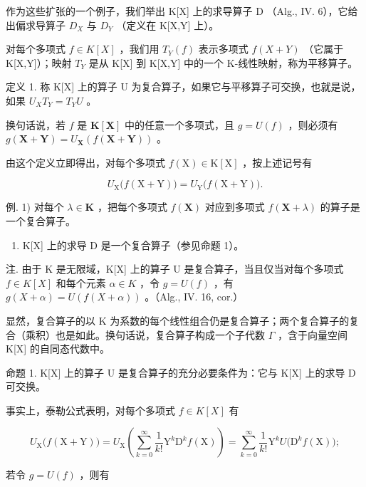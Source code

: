 作为这些扩张的一个例子，我们举出 K{[}X{]} 上的求导算子 D （Alg., IV. 6），它给出偏求导算子 \(D_{X}\) 与 \(D_{Y}\) （定义在 K{[}X,Y{]} 上）。

对每个多项式 \(f \in K[X]\) ，我们用 \(T_{Y}(f)\) 表示多项式 \(f(X + Y)\) （它属于 K{[}X,Y{]}）；映射 \(T_{Y}\) 是从 K{[}X{]} 到 K{[}X,Y{]} 中的一个 K-线性映射，称为平移算子。

定义 1. 称 K{[}X{]} 上的算子 U 为复合算子，如果它与平移算子可交换，也就是说，如果 \(U_{X}T_{Y} = T_{Y}U\) 。

换句话说，若 \(f\) 是 \(\mathbf{K}[\mathbf{X}]\) 中的任意一个多项式，且 \(g = U(f)\) ，则必须有 \(g(\mathbf{X} + \mathbf{Y}) = U_{\mathbf{X}}(f(\mathbf{X} + \mathbf{Y}))\) 。

由这个定义立即得出，对每个多项式 \(f(\mathrm{X}) \in \mathrm{K}[\mathrm{X}]\) ，按上述记号有

\[
U _ {\mathrm{X}} \big (f (\mathrm{X} + \mathrm{Y}) \big) = U _ {\mathrm{Y}} \big (f (\mathrm{X} + \mathrm{Y}) \big).\tag{1}
\]

例. 1) 对每个 \(\lambda \in \mathbf{K}\) ，把每个多项式 \(f(\mathbf{X})\) 对应到多项式 \(f(\mathbf{X} + \lambda)\) 的算子是一个复合算子。

\begin{enumerate}
\def\labelenumi{\arabic{enumi})}
\setcounter{enumi}{1}
\tightlist
\item
  K{[}X{]} 上的求导 D 是一个复合算子（参见命题 1）。
\end{enumerate}

注. 由于 K 是无限域，K{[}X{]} 上的算子 U 是复合算子，当且仅当对每个多项式 \(f \in K[X]\) 和每个元素 \(\alpha \in K\) ，令 \(g = U(f)\) ，有 \(g(X + \alpha) = U(f(X + \alpha))\) 。（Alg., IV. 16, cor.）

显然，复合算子的以 K 为系数的每个线性组合仍是复合算子；两个复合算子的复合（乘积）也是如此。换句话说，复合算子构成一个子代数 \(\Gamma\) ，含于向量空间 K{[}X{]} 的自同态代数中。

命题 1. K{[}X{]} 上的算子 U 是复合算子的充分必要条件为：它与 K{[}X{]} 上的求导 D 可交换。

事实上，泰勒公式表明，对每个多项式 \(f \in K[X]\) 有

\[
U _ {\mathrm{X}} \big (f (\mathrm{X} + \mathrm{Y}) \big) = U _ {\mathrm{X}} \left(\sum_ {k = 0} ^ {\infty} \frac {1}{k !} \mathrm{Y} ^ {k} \mathrm{D} ^ {k} f (\mathrm{X})\right) = \sum_ {k = 0} ^ {\infty} \frac {1}{k !} \mathrm{Y} ^ {k} U \big (\mathrm{D} ^ {k} f (\mathrm{X}) \big);
\]

若令 \(g = U(f)\) ，则有


